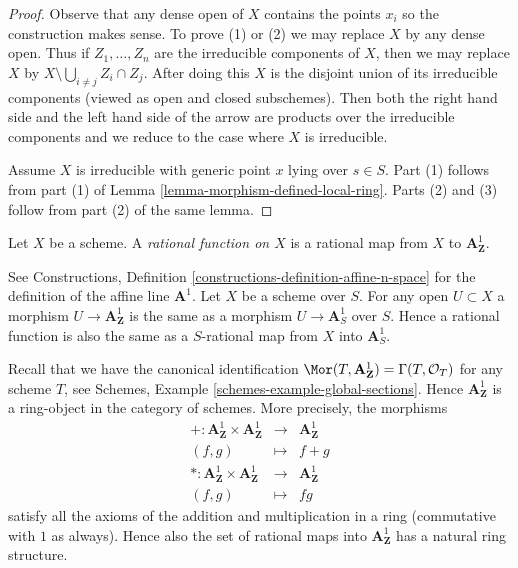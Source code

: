 \begin{proof}
Observe that any dense open of $X$ contains the points $x_i$
so the construction makes sense. To prove (1) or (2)
we may replace $X$ by any dense open. Thus if $Z_1, \ldots, Z_n$
are the irreducible components of $X$, then we may replace
$X$ by $X \setminus \bigcup_{i \not = j} Z_i \cap Z_j$.
After doing this $X$ is the disjoint union of its irreducible
components (viewed as open and closed subschemes). Then both the
right hand side and the left hand side of the arrow are products
over the irreducible components and we reduce to the case where
$X$ is irreducible.

\medskip\noindent
Assume $X$ is irreducible with generic point $x$ lying over $s \in S$.
Part (1) follows from part (1) of
Lemma \ref{lemma-morphism-defined-local-ring}.
Parts (2) and (3) follow from part (2) of the same lemma.
\end{proof}

\begin{definition}
\label{definition-rational-function}
Let $X$ be a scheme. A {\it rational function on $X$} is a rational map
from $X$ to $\mathbf{A}^1_{\mathbf{Z}}$.
\end{definition}

\noindent
See Constructions, Definition \ref{constructions-definition-affine-n-space}
for the definition of the affine line $\mathbf{A}^1$. Let $X$ be a scheme
over $S$. For any open $U \subset X$ a morphism
$U \to \mathbf{A}^1_{\mathbf{Z}}$ is the same as a morphism
$U \to \mathbf{A}^1_S$ over $S$. Hence a rational function is
also the same as a $S$-rational map from $X$ into $\mathbf{A}^1_S$.

\medskip\noindent
Recall that we have the canonical identification
$\Mor(T, \mathbf{A}^1_{\mathbf{Z}}) = \Gamma(T, \mathcal{O}_T)$
for any scheme $T$, see Schemes, Example \ref{schemes-example-global-sections}.
Hence $\mathbf{A}^1_{\mathbf{Z}}$ is a ring-object in the
category of schemes. More precisely, the morphisms
\begin{eqnarray*}
+ : \mathbf{A}^1_{\mathbf{Z}} \times \mathbf{A}^1_{\mathbf{Z}}
& \longrightarrow &
\mathbf{A}^1_{\mathbf{Z}} \\
(f, g) & \longmapsto & f + g \\
* : \mathbf{A}^1_{\mathbf{Z}} \times \mathbf{A}^1_{\mathbf{Z}}
& \longrightarrow &
\mathbf{A}^1_{\mathbf{Z}} \\
(f, g) & \longmapsto & fg
\end{eqnarray*}
satisfy all the axioms of the addition and multiplication in a ring
(commutative with $1$ as always). Hence also the set of rational
maps into $\mathbf{A}^1_{\mathbf{Z}}$ has a natural ring structure.

